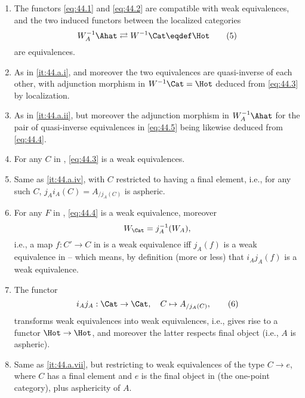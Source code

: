 \begin{enumerate}[label=(\roman*)]
\item\label{it:44.a.i}
  The functors \eqref{eq:44.1} and \eqref{eq:44.2} are compatible
  with weak equivalences, and the two induced functors between the
  localized categories
  \begin{equation}
    \label{eq:44.5}
    W_A^{-1}\Ahat \rightleftarrows W^{-1}\Cat \eqdef \Hot\tag{5}
  \end{equation}
  are equivalences.
\item\label{it:44.a.ii}
  As in \ref{it:44.a.i}, and moreover the two equivalences are
  quasi-inverse of each other, with adjunction morphism in
  $W^{-1}\Cat=\Hot$ deduced from \eqref{eq:44.3} by localization.
\item\label{it:44.a.iii}
  As in \ref{it:44.a.ii}, but moreover the adjunction
  morphism in $W_A^{-1}\Ahat$ for the pair of quasi-inverse
  equivalences in \eqref{eq:44.5} being likewise deduced from
  \eqref{eq:44.4}.
\item\label{it:44.a.iv}
  For any $C$ in \Cat, \eqref{eq:44.3} is a weak equivalences.
\item\label{it:44.a.v}
  Same as \ref{it:44.a.iv}, with $C$ restricted to having a final
  element, i.e., for any such $C$, $j_Ai_A(C)=A_{/j_A(C)}$ is
  aspheric.
\item\label{it:44.a.vi}
  For any $F$ in \Ahat, \eqref{eq:44.4} is a weak equivalence,
  moreover
  \[W_\Cat = j_A^{-1}(W_A),\]
  i.e., a map $f:C'\to C$ in \Cat{} is a weak equivalence if{f}
  $j_A(f)$ is a weak equivalence in \Ahat{} -- which means, by
  definition (more or less) that $i_Aj_A(f)$ is a weak equivalence.
\item\label{it:44.a.vii}
  The functor
  \begin{equation}
    \label{eq:44.6}
    i_Aj_A : \Cat\to\Cat,\quad C\mapsto A_{/j_A(C)},\tag{6}
  \end{equation}
  transforms weak equivalences into weak equivalences, i.e., gives
  rise to a functor $\Hot\to\Hot$, and moreover the latter respects
  final object (i.e., $A$ is aspheric).
\item\label{it:44.a.viii}
  Same as \ref{it:44.a.vii}, but restricting to weak equivalences of
  the type $C\to e$, where $C$ has a final element and $e$ is the
  final object in \Cat{} (the one-point category), plus asphericity
  of $A$.
\end{enumerate}

